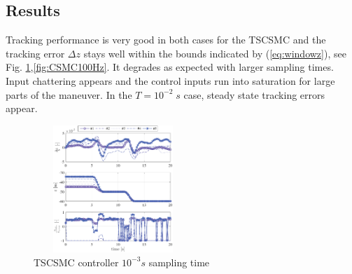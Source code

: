 \documentclass{ifacconf}
\newcommand{\figheight}{4.8cm}
\newcommand{\figwidth}{6cm}
\begin{document}
\subsection{Results}
Tracking performance is very good in both cases for the TSCSMC and the tracking error $\Delta z$ stays well within the bounds indicated by (\ref{eq:windowz}), see Fig. \ref{fig:CSMC1000Hz},\ref{fig:CSMC100Hz}. It degrades as expected with larger sampling times. Input chattering appears and the control inputs run into saturation for large parts of the maneuver. In the $T=10^{-2} \; s$ case, steady state tracking errors appear. 
\begin{figure}[h!]
\begin{center}
\includegraphics[width=\figwidth,height=\figheight]{TSCSMC-1000Hz-TIMESCALESEPARATION-turbulence=1}    %
\caption{TSCSMC controller $10^{-3} s$ sampling time}
\label{fig:CSMC1000Hz}
\end{center}
\end{figure}
\end{document}
